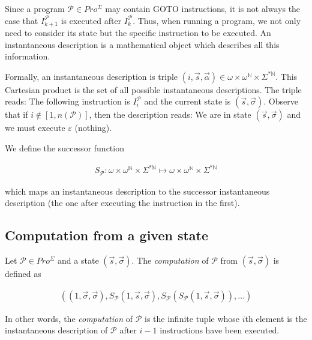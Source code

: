 \documentclass[a4paper, 12pt]{article}
\begin{document}
Since a program $\mathcal{P} \in Pro^{\Sigma}$ may contain GOTO instructions,
it is not always the case that $I_{k+1}^{\mathcal{P}}$ is executed after
$I_k^{\mathcal{P}}$. Thus, when running a program, we not only need to consider
its state but the specific instruction to be executed. An instantaneous
description is a mathematical object which describes all this information.

Formally, an instantaneous description is triple $(i, \overrightarrow{s},
\overrightarrow{\alpha}) \in \omega \times \omega^{\mathbb{N}} \times
\Sigma^{*\mathbb{N}}$. This Cartesian product is the set of all possible
instantaneous descriptions. The triple reads: The following instruction is
$I_{i}^{\mathcal{P}}$ and the current state is $(\overrightarrow{s},
\overrightarrow{\sigma})$. Observe that if $i \not\in [1, n(\mathcal{P})]$, then
the description reads: We are in state $(\overrightarrow{s},
\overrightarrow{\sigma})$ and we must execute $\varepsilon$ (nothing).

We define the successor function

\begin{align*}
    S_\mathcal{P} : \omega \times \omega^{\mathbb{N}} \times
    \Sigma^{*\mathbb{N}} \mapsto  \omega \times \omega^{\mathbb{N}} \times \Sigma^{*\mathbb{N}}
\end{align*}

which maps an instantaneous description to the successor instantaneous
description (the one after executing the instruction in the first). 

\subsection{Computation from a given state}

Let $\mathcal{P} \in Pro^{\Sigma}$ and a state  $(\overrightarrow{s},
\overrightarrow{\sigma})$. The \textit{computation} of $\mathcal{P}$ from
$(\overrightarrow{s}, \overrightarrow{\sigma})$ is defined as 

\begin{align*}
    \left(  (1, \overrightarrow{\sigma}, \overrightarrow{\sigma}),
    S_{\mathcal{P}}\left( 1, \overrightarrow{s}, \overrightarrow{\sigma}
\right), S_{\mathcal{P}} \left( S_{\mathcal{P}} \left( 1, \overrightarrow{s},
\overrightarrow{\sigma} \right)  \right), \ldots   \right) 
\end{align*}

In other words, the \textit{computation} of $\mathcal{P}$ is the infinite tuple
whose $i$th element is the instantaneous description of $\mathcal{P}$ after $i -
1$ instructions have been executed.
\end{document}
